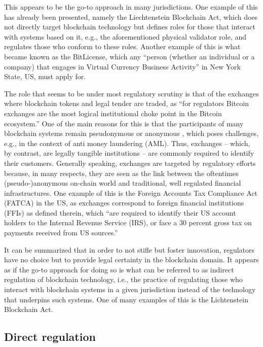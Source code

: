 This appears to be the go-to approach in many jurisdictions.
One example of this has already been presented, namely the Liechtenstein Blockchain Act, which does not directly target blockchain technology but defines roles for those that interact with systems based on it, e.g., the aforementioned physical validator role, and regulates those who conform to these roles.
Another example of this is what became known as the BitLicense, which any ``person (whether an individual or a company) that engages in Virtual Currency Business Activity'' in New York State, US, must apply for. \autocite{bitlicense2020}

The role that seems to be under most regulatory scrutiny is that of the exchanges where blockchain tokens and legal tender are traded, as ``for regulators Bitcoin exchanges are the most logical institutional choke point in the Bitcoin ecosystem.'' \autocite[1153]{tsukerman2015}
One of the main reasons for this is that the participants of many blockchain systems remain pseudonymous \autocite[6]{zhang2019} or anonymous \autocite{saberhagen2013}, which poses challenges, e.g., in the context of anti money laundering (AML).
Thus, exchanges -- which, by contrast, are legally tangible institutions -- are commonly required to identify their customers.
Generally speaking, exchanges are targeted by regulatory efforts because, in many respects, they are seen as the link between the oftentimes (pseudo-)anonymous on-chain world and traditional, well regulated financial infrastructures.
One example of this is the Foreign Accounts Tax Compliance Act (FATCA) in the US, as exchanges correspond to foreign financial institutions (FFIs) as defined therein, which ``are required to identify their US account holders to the Internal Revenue Service (IRS), or face a 30 percent gross tax on payments received from US sources.'' \autocite[1151]{tsukerman2015} 

It can be summarized that in order to not stifle but foster innovation, regulators have no choice but to provide legal certainty in the blockchain domain.
It appears as if the go-to approach for doing so is what can be referred to as indirect regulation of blockchain technology, i.e., the practice of regulating those who interact with blockchain  systems in a given jurisdiction instead of the technology that underpins such systems.
One of many examples of this is the Lichtenstein Blockchain Act.

\subsection{Direct regulation}

